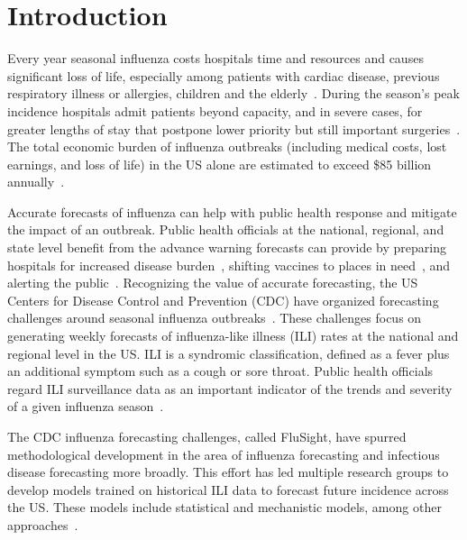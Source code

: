 \documentclass[sagev,times,Review,10pt]{sagej}
\begin{document}

\maketitle

\section{Introduction}

Every year seasonal influenza costs hospitals time and resources and causes significant loss of life, especially among patients with cardiac disease, previous respiratory illness or allergies, children and the elderly~\cite{centers2009prevention,russell2008global,harper2009seasonal,garten2018update}.
During the season's peak incidence hospitals admit patients beyond capacity, and in severe cases, for greater lengths of stay that postpone lower priority but still important surgeries~\cite{krumkamp2011health,schanzer2013impact,molinari2007annual}.
The total economic burden of influenza outbreaks (including medical costs, lost earnings, and loss of life) in the US alone are estimated to exceed \$85 billion annually~\cite{molinari2007annual}.

Accurate forecasts of influenza can help with public health response and mitigate the impact of an outbreak.
Public health officials at the national, regional, and state level benefit from the advance warning forecasts can provide by preparing hospitals for increased disease burden~\cite{reed2009infection}, shifting vaccines to places in need~\cite{germann2006mitigation}, and alerting the public~\cite{vaughan2009effective}.
%
Recognizing the value of accurate forecasting, the US Centers for Disease Control and Prevention (CDC) have organized forecasting challenges around seasonal influenza outbreaks~\cite{biggerstaff2016results,biggerstaff2018results,mcgowan2019collaborative}. 
These challenges focus on generating weekly forecasts of influenza-like illness (ILI) rates at the national and regional level in the US. 
ILI is a syndromic classification, defined as a fever plus an additional symptom such as a cough or sore throat.
Public health officials regard ILI surveillance data as an important indicator of the trends and severity of a given influenza season~\cite{biggerstaff2017systematic}.

The CDC influenza forecasting challenges, called FluSight, have spurred methodological development in the area of influenza forecasting and infectious disease forecasting more broadly.
This effort has led multiple research groups to develop models trained on historical ILI data to forecast future incidence across the US.
These models include statistical and mechanistic models, among other approaches~\cite{shaman2012forecasting,brooks2015flexible,ray2017infectious,osthus2018dynamic}.
\end{document}
